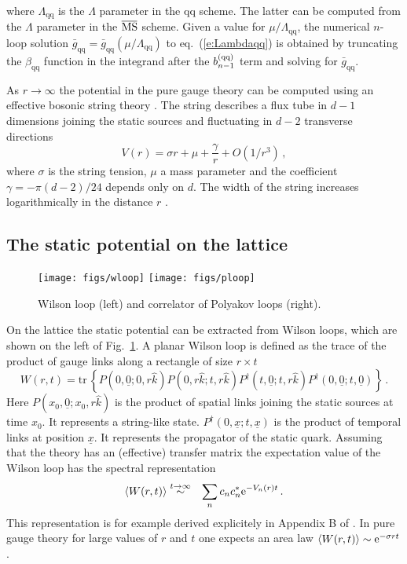 \documentclass{PoS}
\newcommand{\eq}[1]{eq.~(\ref{#1})}
\newcommand{\fig}[1]{Fig.~\ref{#1}}
\newcommand{\tr}{\mathrm{tr}\,}
\newcommand{\ev}[1]{\left\langle #1 \right\rangle}
\newcommand{\msbar}{{\rm \overline{MS\kern-0.05em}\kern0.05em}}
\def\gqq{\bar{g}_\mathrm{qq}}
\def\betaqq{\beta_\mathrm{qq}}
\def\bqq{b^{\rm(qq)}}
\begin{document}
where $\Lambda_\mathrm{qq}$ is the $\Lambda$ parameter in the $\mathrm{qq}$ 
scheme. The latter can be computed from the $\Lambda$ parameter in the
$\msbar$ scheme. Given a value for $\mu/\Lambda_\mathrm{qq}$,
the numerical $n$-loop solution $\gqq=\gqq(\mu/\Lambda_\mathrm{qq})$
to \eq{e:Lambdaqq} is obtained by truncating 
the $\betaqq$ function in the integrand after the $\bqq_{n-1}$ term and 
solving for $\gqq$.

As $r\to\infty$ the potential in the pure gauge theory can be computed using 
an effective bosonic string theory 
\cite{Nambu:1978bd,Luscher:1980fr,Luscher:1980ac,Luscher:2004ib}.
The string describes a flux tube in $d-1$ dimensions joining the static sources 
and fluctuating in $d-2$ transverse directions
\begin{equation}\label{e:string}
V(r) = \sigma r + \mu + \frac{\gamma}{r} + O(1/r^3) \,,
\end{equation}
where $\sigma$ is the string tension, $\mu$ a mass parameter and the
coefficient $\gamma=-\pi(d-2)/24$ depends only on $d$.
The width of the string increases logarithmically in the distance $r$ 
\cite{Luscher:1980iy}.

\subsection{The static potential on the lattice}

%
\begin{figure}[t]\centering
\texttt{[image: figs/wloop]}
\hspace{2cm}
\texttt{[image: figs/ploop]}
\caption{Wilson loop (left) and correlator of Polyakov loops (right).}
  \label{f:loops}
\end{figure}
%

On the lattice the static potential can be extracted from Wilson loops, 
which are shown on the left of \fig{f:loops}.
A planar Wilson loop is defined as the trace of the product of gauge links 
along a rectangle of size $r\times t$
\begin{equation}\label{e:Wloop}
W(r,t) = 
\tr\left\{ P(0,\underline{0};0,r\hat{k})
P(0,r\hat{k};t,r\hat{k})
P^\dagger(t,\underline{0};t,r\hat{k})
P^\dagger(0,\underline{0};t,\underline{0}) \right\} \,.
\end{equation}
Here $P(x_0,\underline{0};x_0,r\hat{k})$ is the product of spatial links 
joining the static sources at time $x_0$. It represents a string-like state.
$P^\dagger(0,\underline{x};t,\underline{x})$ is the product of temporal links at position 
$\underline{x}$. It represents the propagator of the static quark.
Assuming that the theory has an (effective) transfer matrix
the expectation value of the Wilson loop has the spectral representation
\begin{eqnarray}\label{e:Wloopspec}
\ev{W(r,t)} & \stackrel{t\to\infty}{\sim} &
\sum_n c_nc_n^* {\rm e}^{-V_n(r)t} \,.
\end{eqnarray}
This representation is for example derived explicitely in Appendix B of
\cite{Knechtli:1999tw}.
In pure gauge theory for large values of $r$ and $t$ one expects an area law
$\ev{W(r,t)}\sim{\rm e}^{-\sigma r t}$.
\end{document}
